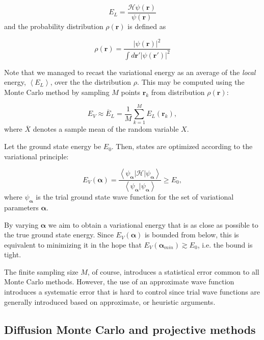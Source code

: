 \begin{equation}\label{eq:local_energy}
E_L = \frac{\mathcal{H} \psi (\bm r) }{\psi (\bm r)}
\end{equation}
and the probability distribution $\rho (\bm r)$ is defined as

\begin{equation}\label{eq:rho}
\rho (\bm r) = \frac{ | \psi (\bm r) |^2}{ \int d\bm r' | \psi (\bm r') |^2}
\end{equation}

Note that we managed to recast the variational energy as an average of the \emph{local} energy, $\left\langle E_L \right\rangle $, over the the distribution $\rho$.
This may be computed using the Monte Carlo method by sampling $M$ points $\bm r_k$ from distribution $\rho (\bm r)$:

\begin{equation}\label{eq:average}
E_V \approx \overline{E}_L = \frac{1}{M} \sum_{k= 1}^{M} E_L (\bm r_k) ,
\end{equation}
where $\overline {X}$ denotes a sample mean of the random variable $X$.

Let the ground state energy be $E_0$.
Then, states are optimized according to the variational principle:

\begin{equation}
E_V(\bm \alpha) = \frac{\left\langle \psi_{\bm \alpha} | \mathcal{H} | \psi_{\bm \alpha} \right\rangle}{\left\langle\psi_{\bm \alpha} | \psi_{\bm \alpha} \right\rangle} \ge E_0,
\end{equation}
where $\psi_{\bm \alpha}$ is the trial ground state wave function for the set of variational parameters ${\bm \alpha}$.

By varying $\bm \alpha$ we aim to obtain a variational energy that is as close as possible to the true ground state energy.
Since $E_V(\bm \alpha)$ is bounded from below, this is equivalent to minimizing it in the hope that $E_V(\bm \alpha_{min}) \gtrsim E_0$, i.e. the bound is tight.

The finite sampling size $M$, of course, introduces a statistical error common to all Monte Carlo methods. 
However, the use of an approximate wave function introduces a systematic error that is hard to control since trial wave functions are generally introduced based on approximate, or heuristic arguments.

\subsection{Diffusion Monte Carlo and projective methods}\label{subsec:dmc}

